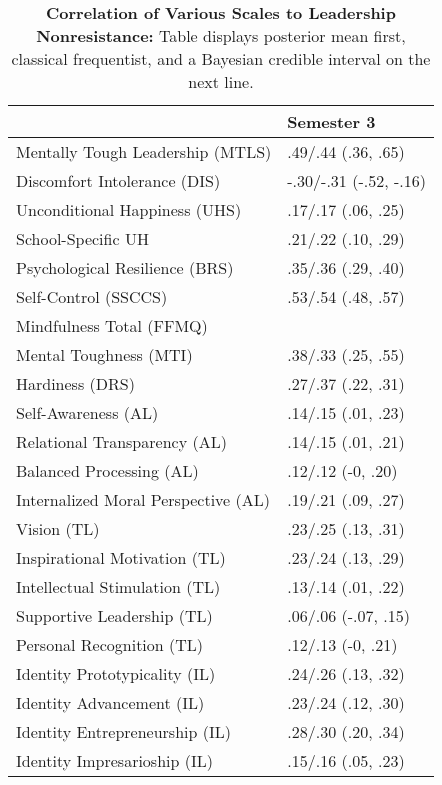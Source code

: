 \begin{table}[ht]
\centering
\begin{tabular}{ll}
  \hline
 & Semester 3 \\ 
  \hline
Mentally Tough Leadership (MTLS) & .49/.44 (.36, .65) \\ 
  Discomfort Intolerance (DIS) & -.30/-.31 (-.52, -.16) \\ 
  Unconditional Happiness (UHS) & .17/.17 (.06, .25) \\ 
  School-Specific UH & .21/.22 (.10, .29) \\ 
  Psychological Resilience (BRS) & .35/.36 (.29, .40) \\ 
  Self-Control (SSCCS) & .53/.54 (.48, .57) \\ 
  Mindfulness Total (FFMQ) &  \\ 
  Mental Toughness (MTI) & .38/.33 (.25, .55) \\ 
  Hardiness (DRS) & .27/.37 (.22, .31) \\ 
  Self-Awareness (AL) & .14/.15 (.01, .23) \\ 
  Relational Transparency (AL) & .14/.15 (.01, .21) \\ 
  Balanced Processing (AL) & .12/.12 (-0, .20) \\ 
  Internalized Moral Perspective (AL) & .19/.21 (.09, .27) \\ 
  Vision (TL) & .23/.25 (.13, .31) \\ 
  Inspirational Motivation (TL) & .23/.24 (.13, .29) \\ 
  Intellectual Stimulation (TL) & .13/.14 (.01, .22) \\ 
  Supportive Leadership (TL) & .06/.06 (-.07, .15) \\ 
  Personal Recognition (TL) & .12/.13 (-0, .21) \\ 
  Identity Prototypicality (IL) & .24/.26 (.13, .32) \\ 
  Identity Advancement (IL) & .23/.24 (.12, .30) \\ 
  Identity Entrepreneurship (IL) & .28/.30 (.20, .34) \\ 
  Identity Impresarioship (IL) & .15/.16 (.05, .23) \\ 
   \hline
\end{tabular}
\caption{\textbf{Correlation of Various Scales to Leadership Nonresistance:} Table displays posterior mean first, classical frequentist, and a Bayesian credible interval on the next line.} 
\label{tab:lnr_corr}
\end{table}
